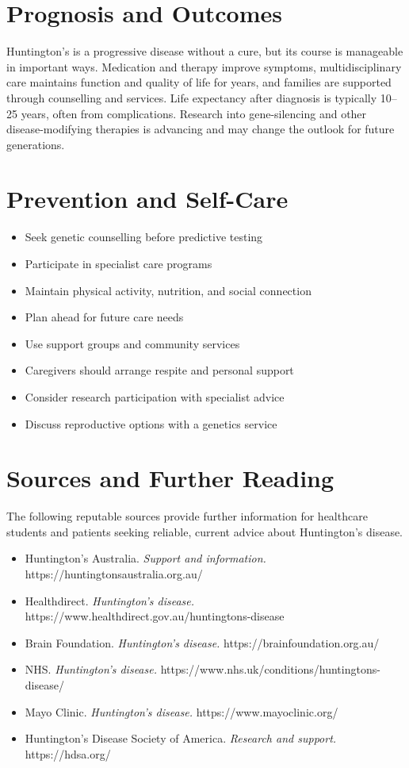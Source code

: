 \section*{Prognosis and Outcomes}
Huntington's is a progressive disease without a cure, but its course is manageable in important ways. Medication and therapy improve symptoms, multidisciplinary care maintains function and quality of life for years, and families are supported through counselling and services. Life expectancy after diagnosis is typically 10--25 years, often from complications. Research into gene-silencing and other disease-modifying therapies is advancing and may change the outlook for future generations.

\section*{Prevention and Self-Care}
\begin{itemize}
    \item Seek genetic counselling before predictive testing
    \item Participate in specialist care programs
    \item Maintain physical activity, nutrition, and social connection
    \item Plan ahead for future care needs
    \item Use support groups and community services
    \item Caregivers should arrange respite and personal support
    \item Consider research participation with specialist advice
    \item Discuss reproductive options with a genetics service
\end{itemize}

\section*{Sources and Further Reading}
The following reputable sources provide further information for healthcare students and patients seeking reliable, current advice about Huntington's disease.

\begin{itemize}
    \item Huntington's Australia. \textit{Support and information.} https://huntingtonsaustralia.org.au/
    \item Healthdirect. \textit{Huntington's disease.} https://www.healthdirect.gov.au/huntingtons-disease
    \item Brain Foundation. \textit{Huntington's disease.} https://brainfoundation.org.au/
    \item NHS. \textit{Huntington's disease.} https://www.nhs.uk/conditions/huntingtons-disease/
    \item Mayo Clinic. \textit{Huntington's disease.} https://www.mayoclinic.org/
    \item Huntington's Disease Society of America. \textit{Research and support.} https://hdsa.org/
\end{itemize}
